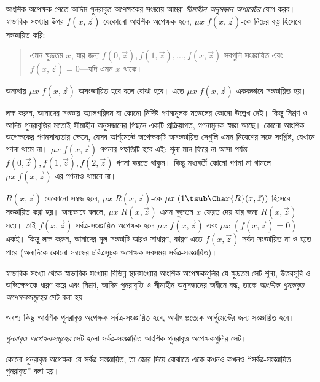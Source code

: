 \documentclass[../../../include/open-logic-section]{subfiles}
\begin{document}
আংশিক অপেক্ষক পেতে আদিম পুনরাবৃত্ত অপেক্ষকের সংজ্ঞায় আমরা
\emph{সীমাহীন অনুসন্ধান অপারেটর} যোগ করব। স্বাভাবিক সংখ্যার উপর
$f(x,\vec z)$ যেকোনো আংশিক অপেক্ষক হলে, $\mu x \; f(x,\vec z)$-কে
নিচের বস্তু হিসেবে সংজ্ঞায়িত করি:
\begin{quote}
  এমন ক্ষুদ্রতম $x$, যার জন্য $f(0,\vec z), f(1,\vec z), \dots, f(x,\vec
  z)$ সবগুলি সংজ্ঞায়িত এবং $f(x,\vec z) = 0$—যদি এমন $x$ থাকে।
\end{quote}
অন্যথায় $\mu x \; f(x,\vec z)$ অসংজ্ঞায়িত হবে বলে বোঝা হবে। এতে
$\mu x \; f(x,\vec z)$ এককভাবে সংজ্ঞায়িত হয়।

\begin{explain}
লক্ষ করুন, আমাদের সংজ্ঞায় অ্যালগরিদম
বা কোনো নির্দিষ্ট গণনামূলক মডেলের কোনো উল্লেখ নেই। কিন্তু মিশ্রণ ও আদিম
পুনরাবৃত্তির মতোই সীমাহীন অনুসন্ধানের পিছনে একটি প্রক্রিয়াগত, গণনামূলক
স্বজ্ঞা আছে। কোনো আংশিক অপেক্ষকের গণনসাধ্যতার ক্ষেত্রে, যেসব আর্গুমেন্টে
অপেক্ষকটি অসংজ্ঞায়িত সেগুলি এমন নিবেশের সঙ্গে সংশ্লিষ্ট, যেখানে গণনা
থামে না। $\mu x \; f(x,\vec z)$ গণনার পদ্ধতিটি হবে এই: শূন্য মান ফিরে না
আসা পর্যন্ত $f(0,\vec z), f(1,\vec z), f(2,\vec z)$ গণনা করতে থাকুন।
কিন্তু মধ্যবর্তী কোনো গণনা না থামলে $\mu x \; f(x,\vec z)$-এর গণনাও
থামবে না।
\end{explain}

$R(x,\vec z)$ যেকোনো সম্বন্ধ হলে, $\mu x \; R(x,\vec z)$-কে
$\mu x \; (1 \tsub \Char{R}(x,\vec z))$ হিসেবে সংজ্ঞায়িত করা হয়।
অন্যভাবে বললে, $\mu x \; R(x,\vec z)$ এমন ক্ষুদ্রতম $x$ ফেরত দেয় যার
জন্য $R(x,\vec z)$ সত্য। তাই $f(x,\vec z)$ সর্বত্র-সংজ্ঞায়িত অপেক্ষক
হলে $\mu x \; f(x,\vec z)$ এবং $\mu x \; (f(x,\vec z) = 0)$ একই।
কিন্তু লক্ষ করুন, আমাদের মূল সংজ্ঞাটি আরও সাধারণ, কারণ এতে $f(x,\vec z)$
সর্বত্র সংজ্ঞায়িত না-ও হতে পারে (অন্যদিকে কোনো সম্বন্ধের চরিত্রসূচক
অপেক্ষক সবসময় সর্বত্র-সংজ্ঞায়িত)।

\begin{defn}
স্বাভাবিক সংখ্যা থেকে স্বাভাবিক সংখ্যায় বিভিন্ন স্থানসংখ্যার আংশিক
অপেক্ষকগুলির যে ক্ষুদ্রতম সেট শূন্য, উত্তরসূরি ও অভিক্ষেপকে ধারণ করে এবং
মিশ্রণ, আদিম পুনরাবৃত্তি ও সীমাহীন অনুসন্ধানের অধীনে বদ্ধ, তাকে
\emph{আংশিক পুনরাবৃত্ত অপেক্ষকসমূহের} সেট বলা হয়।
\end{defn}

অবশ্য কিছু আংশিক পুনরাবৃত্ত অপেক্ষক সর্বত্র-সংজ্ঞায়িত হবে, অর্থাৎ
প্রত্যেক আর্গুমেন্টের জন্য সংজ্ঞায়িত হবে।

\begin{defn}
\emph{পুনরাবৃত্ত অপেক্ষকসমূহের} সেট হলো সর্বত্র-সংজ্ঞায়িত আংশিক
পুনরাবৃত্ত অপেক্ষকগুলির সেট।
\end{defn}

কোনো পুনরাবৃত্ত অপেক্ষক যে সর্বত্র সংজ্ঞায়িত, তা জোর দিয়ে বোঝাতে একে
কখনও কখনও “সর্বত্র-সংজ্ঞায়িত পুনরাবৃত্ত” বলা হয়।
\end{document}

